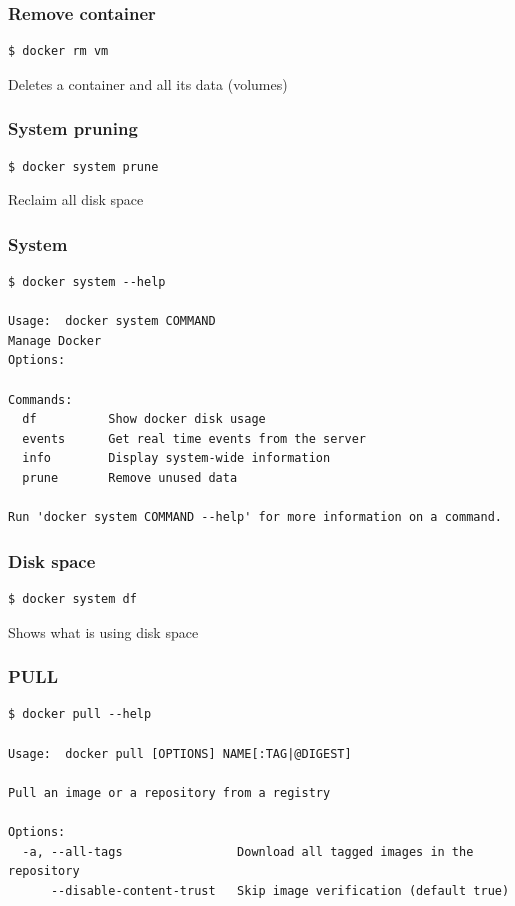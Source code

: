 \begin{frame}[fragile]
\frametitle{Remove container}
\begin{lstlisting}
$ docker rm vm
\end{lstlisting}
Deletes a container and all its data (volumes) 
\end{frame}

\begin{frame}[fragile]
\frametitle{System pruning}
\begin{lstlisting}
$ docker system prune
\end{lstlisting}

Reclaim all disk space
\end{frame}

\begin{frame}[fragile]
\frametitle{System}
\scriptsize
\begin{lstlisting}[breaklines=true]
$ docker system --help

Usage:  docker system COMMAND
Manage Docker
Options:

Commands:
  df          Show docker disk usage
  events      Get real time events from the server
  info        Display system-wide information
  prune       Remove unused data

Run 'docker system COMMAND --help' for more information on a command.
\end{lstlisting}
\normalsize
\end{frame}

\begin{frame}[fragile]
\frametitle{Disk space}
\begin{lstlisting}
$ docker system df
\end{lstlisting}
Shows what is using disk space
\end{frame}

\begin{frame}[fragile]
\frametitle{PULL}
\scriptsize
\begin{lstlisting}[breaklines=true]
$ docker pull --help

Usage:  docker pull [OPTIONS] NAME[:TAG|@DIGEST]

Pull an image or a repository from a registry

Options:
  -a, --all-tags                Download all tagged images in the repository
      --disable-content-trust   Skip image verification (default true)
\end{lstlisting}
\normalsize
\end{frame}

